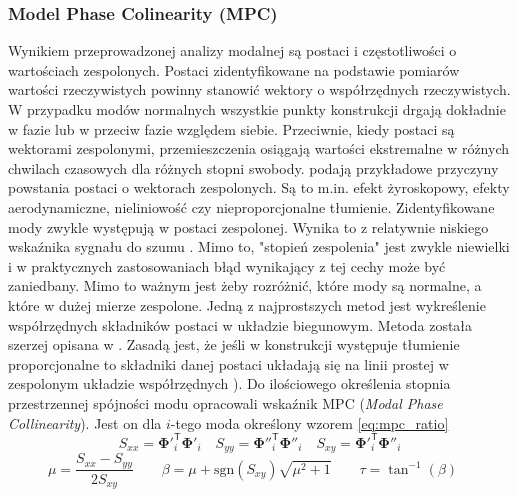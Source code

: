 \subsubsection{Model Phase Colinearity (MPC)}
Wynikiem przeprowadzonej analizy modalnej są postaci i częstotliwości o wartościach zespolonych. Postaci zidentyfikowane na podstawie pomiarów wartości rzeczywistych powinny stanowić wektory o współrzędnych rzeczywistych. W przypadku modów normalnych wszystkie punkty konstrukcji drgają dokładnie w fazie lub w przeciw fazie względem siebie. Przeciwnie, kiedy postaci są wektorami zespolonymi, przemieszczenia osiągają wartości ekstremalne w różnych chwilach czasowych dla różnych stopni swobody. \cite{Ewins2000,Chopra2012a} podają przykładowe przyczyny powstania postaci o wektorach zespolonych. Są to m.in. efekt żyroskopowy, efekty aerodynamiczne, nieliniowość czy nieproporcjonalne tłumienie. Zidentyfikowane mody zwykle występują w postaci zespolonej. Wynika to z relatywnie niskiego wskaźnika sygnału do szumu \parencite{Rainieri2014}. Mimo to, "stopień zespolenia" jest zwykle niewielki i w praktycznych zastosowaniach błąd wynikający z tej cechy może być zaniedbany. Mimo to ważnym jest żeby rozróżnić, które mody są normalne, a które w dużej mierze zespolone. Jedną z najprostszych metod jest wykreślenie współrzędnych składników postaci w układzie biegunowym. Metoda została szerzej opisana w \parencite{Ewins2000}. Zasadą jest, że jeśli w konstrukcji występuje tłumienie proporcjonalne to składniki danej postaci układają się na linii prostej w zespolonym układzie współrzędnych \parencite{Rainieri2014}).
Do ilościowego określenia stopnia przestrzennej spójności modu \cite{Pappa1992} opracowali wskaźnik MPC (\textit{Modal Phase Collinearity}). Jest on dla $i$-tego moda określony wzorem \ref{eq:mpc_ratio}
\begin{equation}
	{S}_{xx}={\mathbf{\Phi}'}_{i}^{\mathsf{T}} {\mathbf{\Phi}} '_{i} \quad
	{S}_{yy}={\mathbf{\Phi}''}_{i}^{\mathsf{T}} {\mathbf{\Phi}}''_{i} \quad
	{S}_{xy}={\mathbf{\Phi}'}_{i}^{\mathsf{T}} {\mathbf{\Phi}}''_{i}
\end{equation}
\begin{equation}
	{\mu}=\frac{S_{xx}-S_{yy}}{2S_{xy}} \quad \quad
	\beta=\mu+\mathrm{sgn}(S_{xy})\sqrt{\mu^{2}+1} \quad \quad
	\tau=\tan^{-1}{(\beta)} \quad
\end{equation}
